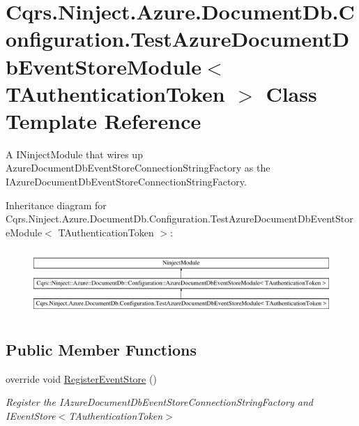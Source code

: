 \hypertarget{classCqrs_1_1Ninject_1_1Azure_1_1DocumentDb_1_1Configuration_1_1TestAzureDocumentDbEventStoreModule}{}\section{Cqrs.\+Ninject.\+Azure.\+Document\+Db.\+Configuration.\+Test\+Azure\+Document\+Db\+Event\+Store\+Module$<$ T\+Authentication\+Token $>$ Class Template Reference}
\label{classCqrs_1_1Ninject_1_1Azure_1_1DocumentDb_1_1Configuration_1_1TestAzureDocumentDbEventStoreModule}


A I\+Ninject\+Module that wires up Azure\+Document\+Db\+Event\+Store\+Connection\+String\+Factory as the I\+Azure\+Document\+Db\+Event\+Store\+Connection\+String\+Factory.  


Inheritance diagram for Cqrs.\+Ninject.\+Azure.\+Document\+Db.\+Configuration.\+Test\+Azure\+Document\+Db\+Event\+Store\+Module$<$ T\+Authentication\+Token $>$\+:\begin{figure}[H]
\begin{center}
\leavevmode
\includegraphics[height=2.526316cm]{classCqrs_1_1Ninject_1_1Azure_1_1DocumentDb_1_1Configuration_1_1TestAzureDocumentDbEventStoreModule}
\end{center}
\end{figure}
\subsection*{Public Member Functions}
\begin{DoxyCompactItemize}
\item 
override void \hyperlink{classCqrs_1_1Ninject_1_1Azure_1_1DocumentDb_1_1Configuration_1_1TestAzureDocumentDbEventStoreModule_a2b3e6c1f8edd6aa4101b98df7d1be93e_a2b3e6c1f8edd6aa4101b98df7d1be93e}{Register\+Event\+Store} ()
\begin{DoxyCompactList}\small\item\em Register the I\+Azure\+Document\+Db\+Event\+Store\+Connection\+String\+Factory and I\+Event\+Store$<$\+T\+Authentication\+Token$>$ \end{DoxyCompactList}\end{DoxyCompactItemize}


